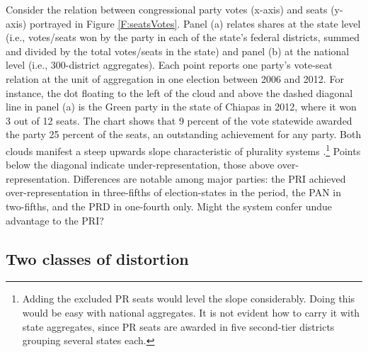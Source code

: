 \documentclass[letter,12pt]{article}
\begin{document}
Consider the relation between congressional party votes (x-axis) and seats (y-axis) portrayed in Figure \ref{F:seatsVotes}. Panel (a) relates shares at the state level (i.e., votes/seats won by the party in each of the state's federal districts, summed and divided by the total votes/seats in the state) and panel (b) at the national level (i.e., 300-district aggregates). Each point reports one party's vote-seat relation at the unit of aggregation in one election between 2006 and 2012. For instance, the dot floating to the left of the cloud and above the dashed diagonal line in panel (a) is the Green party in the state of Chiapas in 2012, where it won 3 out of 12 seats. The chart shows that 9 percent of the vote statewide awarded the party 25 percent of the seats, an outstanding achievement for any party. Both clouds manifest a steep upwards slope characteristic of plurality systems \citep{taagepera.CubeLaw.1973}.\footnote{Adding the excluded PR seats would level the slope considerably. Doing this would be easy with national aggregates. It is not evident how to carry it with state aggregates, since PR seats are awarded in five second-tier districts grouping several states each.} Points below the diagonal indicate under-representation, those above over-representation. Differences are notable among major parties: the PRI achieved over-representation in three-fifths of election-states in the period, the PAN in two-fifths, and the PRD in one-fourth only. Might the system confer undue advantage to the PRI? %

\subsection{Two classes of distortion}

\end{document}

